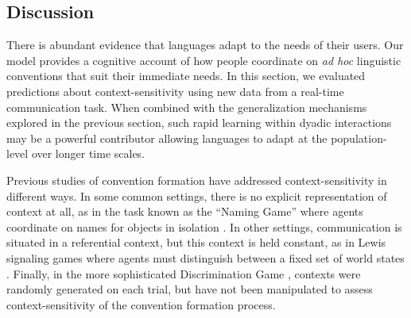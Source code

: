 %

\subsection{Discussion}

There is abundant evidence that languages adapt to the needs of their users.
Our model provides a cognitive account of how people coordinate on \emph{ad hoc} linguistic conventions that suit their immediate needs.
In this section, we evaluated predictions about context-sensitivity using new data from a real-time communication task.
When combined with the generalization mechanisms explored in the previous section, such rapid learning within dyadic interactions may be a powerful contributor allowing languages to adapt at the population-level over longer time scales.

Previous studies of convention formation have addressed context-sensitivity in different ways.
In some common settings, there is no explicit representation of context at all, as in the task known as the ``Naming Game'' where agents coordinate on names for objects in isolation \cite{steels2012experiments,baronchelli2008depth}. 
In other settings, communication is situated in a referential context, but this context is held constant, as in Lewis signaling games \cite{lewis_convention:_1969} where agents must distinguish between a fixed set of world states \cite{skyrms2010signals,BrunerEtAl14_LewisConventions}.
Finally, in the more sophisticated Discrimination Game \cite{steels2005coordinating,baronchelli2010modeling}, contexts were randomly generated on each trial, but have not been manipulated to assess context-sensitivity of the convention formation process.

